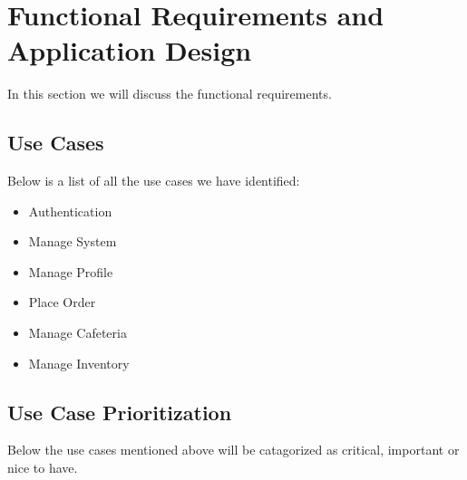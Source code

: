 \documentclass[a4paper,12pt]{article}
\begin{document}
\section{Functional Requirements and Application Design}
In this section we will discuss the functional requirements. \\

\subsection{Use Cases }
Below is a list of all the use cases we have identified:

\begin{itemize}

\item Authentication
\item Manage System
\item Manage Profile
\item Place Order
\item Manage Cafeteria
\item Manage Inventory 

\end{itemize}


\subsection{Use Case Prioritization}
Below the use cases mentioned above will be catagorized as critical, important or nice to have.
\end{document}
